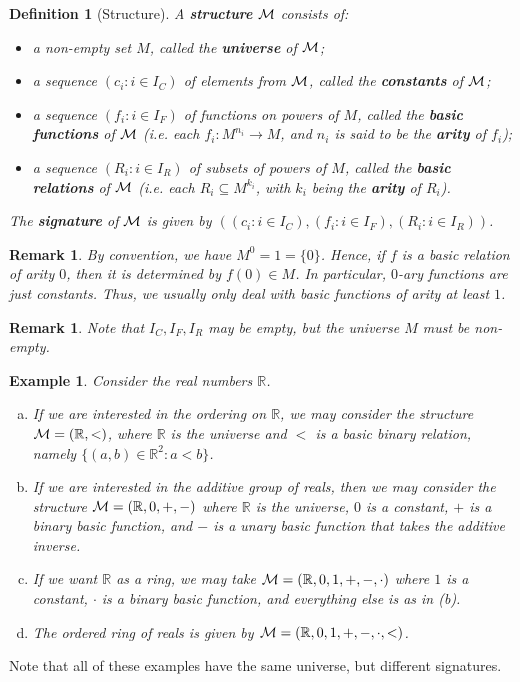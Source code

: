 \documentclass[10pt]{article}
\newcommand{\R}{\mathbb{R}}
\theoremstyle{newstyle}
\newtheorem{remark}[thm]{Remark}
\newtheorem{defn}[thm]{Definition}
\newtheorem{exmp}[thm]{Example}
\begin{document}
\begin{defn}[Structure]
A {\bf structure} ${\cal M}$ consists of:
\begin{itemize}
    \item a non-empty set $M$, called the {\bf universe} of ${\cal M}$; 
    \item a sequence $(c_i : i \in I_C)$ of elements from ${\cal M}$, called the 
    {\bf constants} of ${\cal M}$;
    \item a sequence $(f_i : i \in I_F)$ of functions on powers of $M$, called 
    the {\bf basic functions} of ${\cal M}$ (i.e. each $f_i : M^{n_i} \to M$, 
    and $n_i$ is said to be the {\bf arity} of $f_i$);
    \item a sequence $(R_i : i \in I_R)$ of subsets of powers of $M$, called the 
    {\bf basic relations} of ${\cal M}$ (i.e. each $R_i \subseteq M^{k_i}$, 
    with $k_i$ being the {\bf arity} of $R_i$).
\end{itemize}
The {\bf signature} of ${\cal M}$ is given by $((c_i : i \in I_C), (f_i : i \in I_F), 
(R_i : i \in I_R))$.
\end{defn}

\begin{remark}
By convention, we have $M^0 = 1 = \{0\}$. Hence, if $f$ is a basic relation of arity $0$, 
then it is determined by $f(0) \in M$. In particular, $0$-ary functions are just constants. 
Thus, we usually only deal with basic functions of arity at least $1$.
\end{remark}

\begin{remark}
Note that $I_C, I_F, I_R$ may be empty, but the universe $M$ must be non-empty.
\end{remark}

\begin{exmp}
Consider the real numbers $\R$.
\begin{enumerate}[(a)]
    \item If we are interested in the ordering on $\R$, we may consider the structure ${\cal M} = (\R, <)$, where $\R$ is the universe and $<$ is a basic binary relation, namely
    $\{(a, b) \in \R^2 : a < b\}$.
    \item If we are interested in the additive group of reals, then we may consider the 
    structure ${\cal M} = (\R, 0, +, -)$ where $\R$ is the universe, $0$ is a constant, 
    $+$ is a binary basic function, and $-$ is a unary basic function that takes the 
    additive inverse.
    \item If we want $\R$ as a ring, we may take ${\cal M} = (\R, 0, 1, +, -, \cdot)$ 
    where $1$ is a constant, $\cdot$ is a binary basic function, and everything else 
    is as in (b).
    \item The ordered ring of reals is given by ${\cal M} = (\R, 0, 1, +, -, \cdot, <)$.
\end{enumerate}
\end{exmp}
Note that all of these examples have the same universe, but different signatures. 
\end{document}
